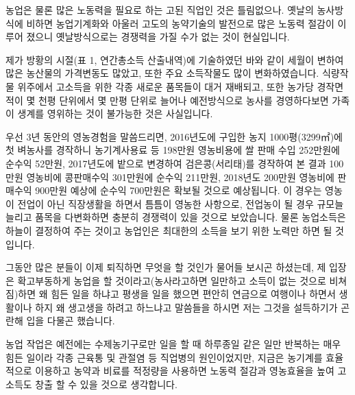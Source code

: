 \documentclass[chapter,book,openany,twoside]{oblivoir}
\begin{document}
농업은 물론 많은 노동력을 필요로 하는 고된 직업인 것은 틀림없으나. 옛날의 농사방식에 비하면 농업기계화와 아울러 고도의 농약기술의 발전으로 많은 노동력 절감이 이루어 졌으니 옛날방식으로는 경쟁력을 가질 수가 없는 것이 현실입니다.

제가 방황의 시절(표 1, 연간총소득 산출내역)에 기술하였던 바와 같이 세월이 변하여 많은 농산물의 가격변동도 많았고, 또한 주요 소득작물도 많이 변화하였습니다. 식량작물 위주에서 고소득을 위한 각종 새로운 품목들이 대거 재배되고, 또한 농가당 경작면적이 몇 천평 단위에서 몇 만평 단위로 늘어나 예전방식으로 농사를 경영하다보면 가족이 생계를 영위하는 것이 불가능한 것은 사실입니다.

우선 3년 동안의 영농경험을 말씀드리면, 2016년도에 구입한 농지 1000평(3299㎡)에 첫 벼농사를 경작하니 농기계사용료 등 198만원 영농비용에 쌀 판매 수입 252만원에 순수익 52만원, 2017년도에 밭으로 변경하여 검은콩(서리태)를 경작하여 본 결과 100만원 영농비에 콩판매수익 301만원에 순수익 211만원, 2018년도 200만원 영농비에 판매수익 900만원 예상에 순수익 700만원은 확보될 것으로 예상됩니다. 이 경우는 영농이 전업이 아닌 직장생활을 하면서 틈틈이 영농한 사항으로, 전업농이 될 경우 규모늘 늘리고 품목을 다변화하면 충분히 경쟁력이 있을 것으로 보았습니다. 물론 농업소득은 하늘이 결정하여 주는 것이고 농업인은 최대한의 소득을 보기 위한 노력만 하면 될 것입니다.

그동안 많은 분들이 이제 퇴직하면 무엇을 할 것인가 물어들 보시곤 하셨는데, 제 입장은 확고부동하게 농업을 할 것이라고(농사라고하면 일만하고 소득이 없는 것으로 비쳐짐)하면 왜 힘든 일을 하냐고 평생을 일을 했으면 편안히 연금으로 여행이나 하면서 생활이나 하지 왜 생고생을 하려고 하느냐고 말씀들을 하시면 저는 그것을 설득하기가 곤란해 입을 다물곤 했습니다. 

농업 작업은 예전에는 수제농기구로만 일을 할 때 하루종일 같은 일만 반복하는 매우 힘든 일이라 각종 근육통 및 관절염 등 직업병의 원인이었지만, 지금은 농기계를 효율적으로 이용하고 농약과 비료를 적정량을 사용하면 노동력 절감과 영농효율을 높여 고소득도 창출 할 수 있을 것으로 생각합니다. 
\end{document}
